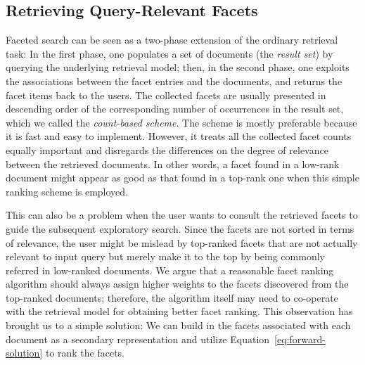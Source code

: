 \subsection{Retrieving Query-Relevant Facets}\label{s:facet-ranking}

Faceted search \cite{hearst2002finding,yee2003faceted,roy2008minimum} can be
seen as a two-phase extension of the ordinary retrieval task: In the first
phase, one populates a set of documents (the \emph{result set}) by querying the
underlying retrieval model; then, in the second phase, one exploits the
associations between the facet entries and the documents, and returns the facet
items back to the users.  The collected facets are usually presented in
descending order of the corresponding number of occurrences in the result set,
which we called the \emph{count-based scheme}.  The scheme is mostly preferable
because it is fast and easy to implement.  However, it treats all the collected
facet counts equally important and disregards the differences on the degree of
relevance between the retrieved documents.  In other words, a facet found in a
low-rank document might appear as good as that found in a top-rank one when
this simple ranking scheme is employed.

This can also be a problem when the user wants to consult the retrieved facets
to guide the subsequent exploratory search.  Since the facets are not sorted in
terms of relevance, the user might be mislead by top-ranked facets that are not
actually relevant to input query but merely make it to the top by being
commonly referred in low-ranked documents.  We argue that a reasonable facet
ranking algorithm should always assign higher weights to the facets discovered
from the top-ranked documents; therefore, the algorithm itself may need to
co-operate with the retrieval model for obtaining better facet ranking.  This
observation has brought us to a simple solution: We can build in the facets
associated with each document as a secondary representation and utilize
Equation~\ref{eq:forward-solution} to rank the facets.  


